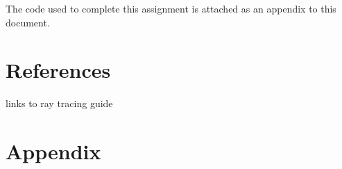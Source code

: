 \documentclass{article}
\begin{document}
The code used to complete this assignment is attached as an appendix to this document.

\section{References}
links to ray tracing guide


\newpage
\onecolumn
\section{Appendix}



\end{document}
